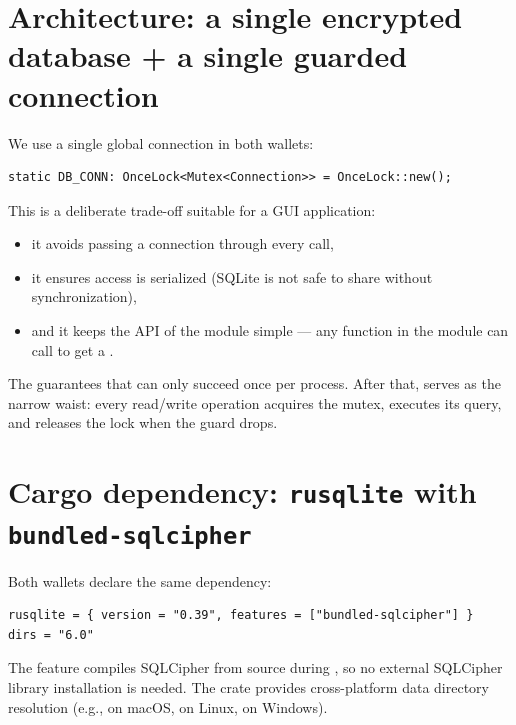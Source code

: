 \section{Architecture: a single encrypted database + a single guarded connection}
\label{sec:single-connection-pattern}

We use a single global connection in both wallets:

\begin{verbatim}
static DB_CONN: OnceLock<Mutex<Connection>> = OnceLock::new();
\end{verbatim}

This is a deliberate trade-off suitable for a GUI application:

\begin{itemize}
  \item it avoids passing a connection through every call,
  \item it ensures access is serialized (SQLite  is not safe to share without synchronization),
  \item and it keeps the API of the module simple --- any function in the module can call  to get a .
\end{itemize}

The  guarantees that  can only succeed once per process. After that,  serves as the narrow waist: every read/write operation acquires the mutex, executes its query, and releases the lock when the guard drops.

\section{Cargo dependency: \texttt{rusqlite} with \texttt{bundled-sqlcipher}}
\label{sec:cargo-deps}

Both wallets declare the same dependency:

\begin{verbatim}
rusqlite = { version = "0.39", features = ["bundled-sqlcipher"] }
dirs = "6.0"
\end{verbatim}

The  feature compiles SQLCipher from source during , so no external SQLCipher library installation is needed. The  crate provides cross-platform data directory resolution (e.g.,  on macOS,  on Linux,  on Windows).

